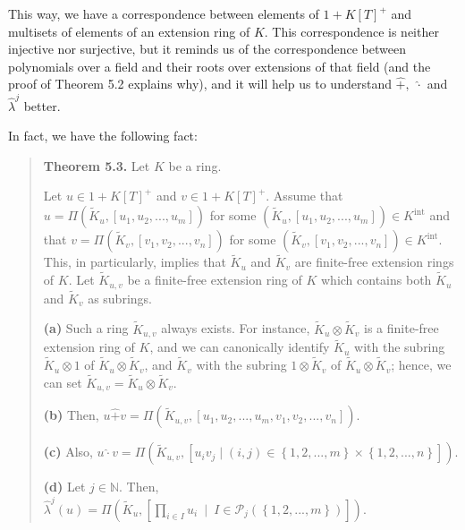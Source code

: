 \documentclass[12pt,final,notitlepage,onecolumn,german]{article}%
\begin{document}
This way, we have a correspondence between elements of $1+K\left[  T\right]
^{+}$ and multisets of elements of an extension ring of $K$. This
correspondence is neither injective nor surjective, but it reminds us of the
correspondence between polynomials over a field and their roots over
extensions of that field (and the proof of Theorem 5.2 explains why), and it
will help us to understand $\widehat{+},$ $\widehat{\cdot}$ and $\widehat
{\lambda}^{j}$ better.

In fact, we have the following fact:

\begin{quote}
\textbf{Theorem 5.3.} Let $K$ be a ring.

Let $u\in1+K\left[  T\right]  ^{+}$ and $v\in1+K\left[  T\right]  ^{+}$.
Assume that $u=\Pi\left(  \widetilde{K}_{u},\left[  u_{1},u_{2},...,u_{m}%
\right]  \right)  $ for some $\left(  \widetilde{K}_{u},\left[  u_{1}%
,u_{2},...,u_{m}\right]  \right)  \in K^{\operatorname*{int}}$ and that
$v=\Pi\left(  \widetilde{K}_{v},\left[  v_{1},v_{2},...,v_{n}\right]  \right)
$ for some $\left(  \widetilde{K}_{v},\left[  v_{1},v_{2},...,v_{n}\right]
\right)  \in K^{\operatorname*{int}}$. This, in particularly, implies that
$\widetilde{K}_{u}$ and $\widetilde{K}_{v}$ are finite-free extension rings of
$K$. Let $\widetilde{K}_{u,v}$ be a finite-free extension ring of $K$ which
contains both $\widetilde{K}_{u}$ and $\widetilde{K}_{v}$ as subrings.

\textbf{(a)} Such a ring $\widetilde{K}_{u,v}$ always exists. For instance,
$\widetilde{K}_{u}\otimes\widetilde{K}_{v}$ is a finite-free extension ring of
$K$, and we can canonically identify $\widetilde{K}_{u}$ with the subring
$\widetilde{K}_{u}\otimes1$ of $\widetilde{K}_{u}\otimes\widetilde{K}_{v}$,
and $\widetilde{K}_{v}$ with the subring $1\otimes\widetilde{K}_{v}$ of
$\widetilde{K}_{u}\otimes\widetilde{K}_{v}$; hence, we can set $\widetilde
{K}_{u,v}=\widetilde{K}_{u}\otimes\widetilde{K}_{v}$.

\textbf{(b)} Then, $u\widehat{+}v=\Pi\left(  \widetilde{K}_{u,v},\left[
u_{1},u_{2},...,u_{m},v_{1},v_{2},...,v_{n}\right]  \right)  $.

\textbf{(c)} Also, $u\widehat{\cdot}v=\Pi\left(  \widetilde{K}_{u,v},\left[
u_{i}v_{j}\mid\left(  i,j\right)  \in\left\{  1,2,...,m\right\}
\times\left\{  1,2,...,n\right\}  \right]  \right)  $.

\textbf{(d)} Let $j\in\mathbb{N}$. Then, $\widehat{\lambda}^{j}\left(
u\right)  =\Pi\left(  \widetilde{K}_{u},\left[  \prod\limits_{i\in I}%
u_{i}\ \mid\ I\in\mathcal{P}_{j}\left(  \left\{  1,2,...,m\right\}  \right)
\right]  \right)  $.
\end{quote}
\end{document}
